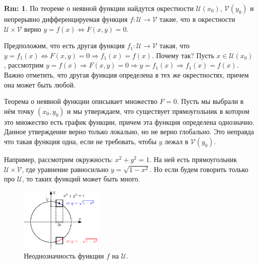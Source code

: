 \documentclass[12pt]{article}
\newcommand{\MU}{\mathcal{U}}
\newcommand{\MV}{\mathcal{V}}
\theoremstyle{definition}
\newtheorem{rem}{Rm:}
\begin{document}
\begin{rem}
	По теореме о неявной функции найдутся окрестности $\MU(x_0), \, \MV(y_0)$ и непрерывно дифференцируемая функция $f \colon \MU \to \MV$ такие, что в окрестности $\MU \times \MV$ верно $y =f(x) \Leftrightarrow F(x,y) = 0$.
	
	Предположим, что есть другая функция $f_1 \colon \MU \to \MV$ такая, что $y = f_1(x) \Leftrightarrow F(x,y) = 0 \Rightarrow f_1(x) = f(x)$. Почему так? Пусть $x \in \MU(x_0)$, рассмотрим $y = f(x) \Rightarrow F(x,y) = 0 \Rightarrow y = f_1(x) \Rightarrow f_1(x) = f(x)$. Важно отметить, что другая функция определена в тех же окрестностях, причем она может быть любой.
	
	Теорема о неявной функции описывает множество $F = 0$. Пусть мы выбрали в нём точку $(x_0, y_0)$ и мы утверждаем, что существует прямоугольник в котором это множество есть график функции, причем эта функция определена однозначно. Данное утверждение верно только локально, но не верно глобально. Это неправда что такая функция одна, если не требовать, чтобы $y$ лежал в $\MV(y_0)$.
	
	Например, рассмотрим окружность: $x^2 + y^2 =1$. На ней есть прямоугольник $\MU \times \MV$, где уравнение равносильно $y = \sqrt{1 - x^2}$. Но если будем говорить только про $\MU$, то таких функций может быть много.
	\begin{figure}[H]
		\centering
		\includegraphics[width=0.35\textwidth]{17_1.eps}
		\caption{Неоднозначность функции $f$ на $\MU$.}
		\label{17_1}
	\end{figure}
\end{rem}

\newpage
\end{document}
